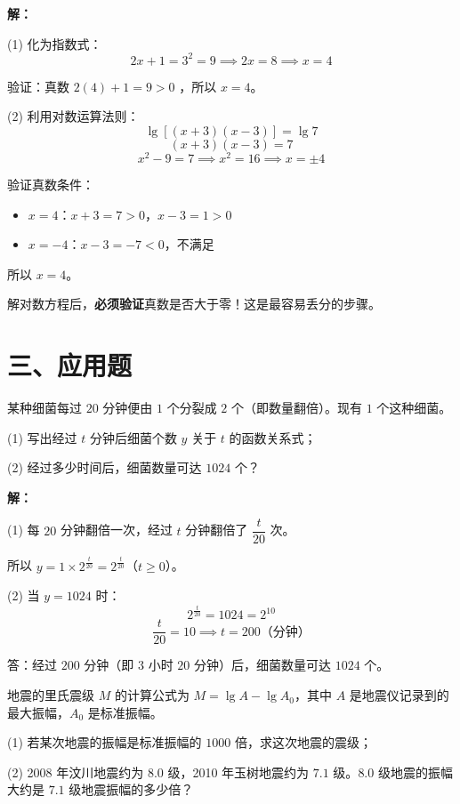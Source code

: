 \documentclass[12pt, a4paper]{ctexart}
\begin{document}
\textbf{解：}

(1) 化为指数式：
\[
2x + 1 = 3^2 = 9 \implies 2x = 8 \implies x = 4
\]

验证：真数 $2(4)+1 = 9 > 0$ \checkmark，所以 $x=4$。

(2) 利用对数运算法则：
\[
\lg[(x+3)(x-3)] = \lg 7
\]
\[
(x+3)(x-3) = 7
\]
\[
x^2 - 9 = 7 \implies x^2 = 16 \implies x = \pm 4
\]

验证真数条件：
\begin{itemize}[leftmargin=2em]
  \item $x=4$：$x+3=7>0$，$x-3=1>0$ \checkmark
  \item $x=-4$：$x-3=-7<0$，不满足 \texttimes
\end{itemize}

所以 $x=4$。

\begin{warnbox}[解对数方程的关键]
解对数方程后，\textbf{必须验证}真数是否大于零！这是最容易丢分的步骤。
\end{warnbox}


\section*{\textcolor{apppurple}{三、应用题}}

\begin{appbox}[【应用1】细菌繁殖模型]
某种细菌每过 $20$ 分钟便由 $1$ 个分裂成 $2$ 个（即数量翻倍）。现有 $1$ 个这种细菌。

(1) 写出经过 $t$ 分钟后细菌个数 $y$ 关于 $t$ 的函数关系式；

(2) 经过多少时间后，细菌数量可达 $1024$ 个？
\end{appbox}

\textbf{解：}

(1) 每 $20$ 分钟翻倍一次，经过 $t$ 分钟翻倍了 $\dfrac{t}{20}$ 次。

所以 $y = 1 \times 2^{\frac{t}{20}} = 2^{\frac{t}{20}}$（$t\geq 0$）。

(2) 当 $y=1024$ 时：
\[
2^{\frac{t}{20}} = 1024 = 2^{10}
\]
\[
\frac{t}{20} = 10 \implies t = 200 \text{（分钟）}
\]

答：经过 $200$ 分钟（即 $3$ 小时 $20$ 分钟）后，细菌数量可达 $1024$ 个。

\begin{appbox}[【应用2】地震震级与对数]
地震的里氏震级 $M$ 的计算公式为 $M = \lg A - \lg A_0$，其中 $A$ 是地震仪记录到的最大振幅，$A_0$ 是标准振幅。

(1) 若某次地震的振幅是标准振幅的 $1000$ 倍，求这次地震的震级；

(2) 2008 年汶川地震约为 $8.0$ 级，2010 年玉树地震约为 $7.1$ 级。$8.0$ 级地震的振幅大约是 $7.1$ 级地震振幅的多少倍？
\end{appbox}
\end{document}
